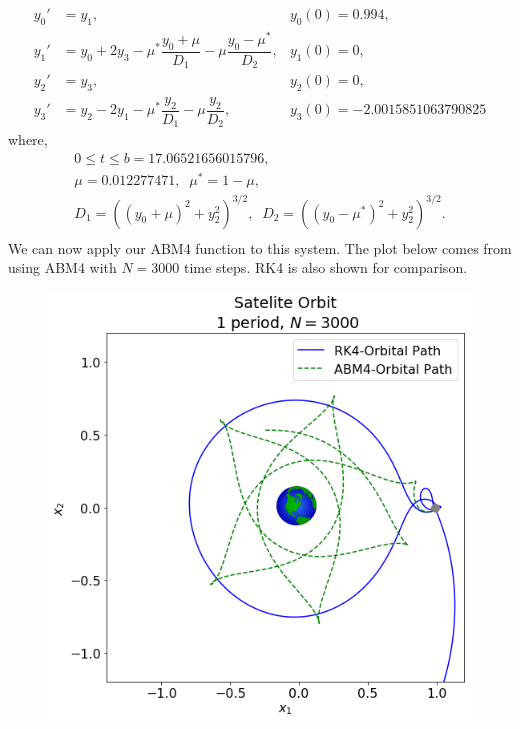 \documentclass[final,oneside,onecolumn]{article}
\begin{document}
\begin{enumerate}
\begin{enumerate}
\begin{equation*}
	\begin{array}{rll}
	y_0' &= y_1, & y_0(0) = 0.994, \\
	y_1' &= y_0 + 2y_3 - \mu^{*}\dfrac{y_0 + \mu}{D_1} - \mu\dfrac{y_0 - \mu^{*}}{D_2}, & y_1(0) = 0,\\
	y_2' &= y_3, & y_2(0) = 0, \\
	y_3' &= y_2 - 2y_1 - \mu^{*}\dfrac{y_2}{D_1} - \mu\dfrac{y_2}{D_2}, & y_3(0) = -2.0015851063790825
	\end{array}
\end{equation*}
where,
\begin{equation*}
	\begin{array}{c}
	0 \leq t \leq b=17.06521656015796, \\
	\mu = 0.012277471,\;\; \mu^{*} = 1-\mu, \\
	D_1 = ((y_0 + \mu)^2 + y_2^2)^{3/2}, \;\; D_2 = ((y_0 - \mu^{*})^2 + y_2^2)^{3/2}. \\
	\end{array}
\end{equation*}
We can now apply our ABM4 function to this system. The plot below comes from using ABM4 with $N=3000$ time steps. RK4 is also shown for comparison.
   
\begin{figure}[H]
	\centering
	\includegraphics[width=.6\linewidth]{hw5_3a_3ksteps}
\end{figure}


\end{enumerate}
\end{enumerate}
\end{document}
